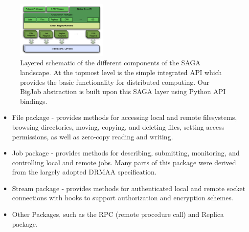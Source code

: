 \documentclass[conference,final]{IEEEtran}
\begin{document}
\begin{figure}[!ht]
 \begin{center}
     \includegraphics[width=0.40\textwidth]{stci_saga_figures-1.pdf}
 \end{center}
\caption{\small Layered schematic of the different components of the
   SAGA landscape. At the topmost level is the simple integrated API
   which provides the basic functionality for distributed
   computing. Our BigJob abstraction is built upon this SAGA layer
   using Python API bindings.} \label{Fig:SAGA1}
\end{figure}

\begin{itemize}
\item File package - provides methods for accessing local and remote
 filesystems, browsing directories, moving, copying, and deleting
 files, setting access permissions, as well as zero-copy reading and
 writing.
\item Job package - provides methods for describing, submitting,
 monitoring, and controlling local and remote jobs. Many parts of
 this package were derived from the largely adopted
 DRMAA %
 specification.
\item Stream package - provides methods for authenticated local and
 remote socket connections with hooks to support authorization and
 encryption schemes.
\item Other Packages, such as the RPC (remote procedure call) and Replica
 package.
\end{itemize}
\end{document}
